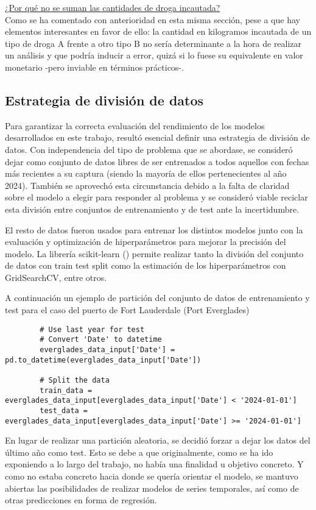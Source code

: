 \documentclass[12pt]{article}
\begin{document}
		\underline{¿Por qué no se suman las cantidades de droga incautada?}\\
		Como se ha comentado con anterioridad en esta misma sección, pese a que hay elementos interesantes en favor de ello: la cantidad en kilogramos incautada de un tipo de droga A frente a otro tipo B no sería determinante a la hora de realizar un análisis y que podría inducir a error, quizá si lo fuese su equivalente en valor monetario -pero inviable en términos prácticos-.
		
	\subsection{Estrategia de división de datos}
	Para garantizar la correcta evaluación del rendimiento de los modelos desarrollados en este trabajo, resultó esencial definir una estrategia de división de datos. Con independencia del tipo de problema que se abordase, se consideró dejar como conjunto de datos libres de ser entrenados a todos aquellos con fechas más recientes a su captura (siendo la mayoría de ellos pertenecientes al año 2024). También se aprovechó esta circunstancia debido a la falta de claridad sobre el modelo a elegir para responder al problema y se consideró viable reciclar esta división entre conjuntos de entrenamiento y de test ante la incertidumbre.
	
	El resto de datos fueron usados para entrenar los distintos modelos junto con la evaluación y optimización de hiperparámetros para mejorar la precisión del modelo. La librería scikit-learn (\cite{scikit-learn}) permite realizar tanto la división del conjunto de datos con train test split como la estimación de los hiperparámetros con GridSearchCV, entre otros.
	
	A continuación un ejemplo de partición del conjunto de datos de entrenamiento y test para el caso del puerto de Fort Lauderdale (Port Everglades)
	\begin{verbatim}
		# Use last year for test
		# Convert 'Date' to datetime
		everglades_data_input['Date'] = pd.to_datetime(everglades_data_input['Date'])
		
		# Split the data
		train_data = everglades_data_input[everglades_data_input['Date'] < '2024-01-01']
		test_data = everglades_data_input[everglades_data_input['Date'] >= '2024-01-01']
	\end{verbatim}

	En lugar de realizar una partición aleatoria, se decidió forzar a dejar los datos del último año como test. Esto se debe a que originalmente, como se ha ido exponiendo a lo largo del trabajo, no había una finalidad u objetivo concreto. Y como no estaba concreto hacia donde se quería orientar el modelo, se mantuvo abiertas las posibilidades de realizar modelos de series temporales, así como de otras predicciones en forma de regresión.
	
\end{document}
